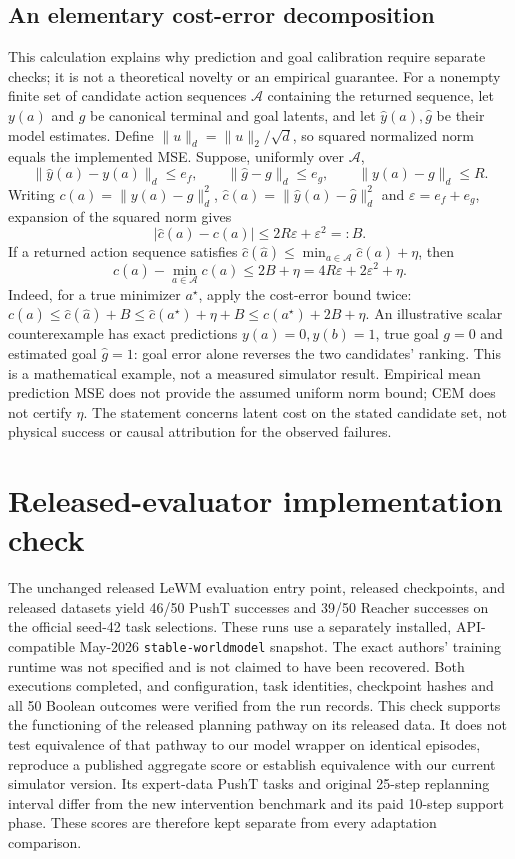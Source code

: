 \subsection{An elementary cost-error decomposition}
This calculation explains why prediction and goal calibration require separate
checks; it is not a theoretical novelty or an empirical guarantee.
For a nonempty finite set of candidate action sequences $\mathcal A$ containing
the returned sequence, let $y(a)$ and $g$ be canonical terminal and goal latents,
and let $\hat y(a),\hat g$ be their model estimates. Define
$\|u\|_d=\|u\|_2/\sqrt d$, so squared normalized norm equals the implemented MSE.
Suppose, uniformly over $\mathcal A$,
\[
 \|\hat y(a)-y(a)\|_d\le e_f,\qquad
 \|\hat g-g\|_d\le e_g,\qquad \|y(a)-g\|_d\le R.
\]
Writing $c(a)=\|y(a)-g\|_d^2$, $\hat c(a)=\|\hat y(a)-\hat g\|_d^2$
and $\varepsilon=e_f+e_g$, expansion of the squared norm gives
\[
 |\hat c(a)-c(a)|\le 2R\varepsilon+\varepsilon^2=:B.
\]
If a returned action sequence satisfies
$\hat c(\hat a)\le\min_{a\in\mathcal A}\hat c(a)+\eta$, then
\[
 c(\hat a)-\min_{a\in\mathcal A}c(a)
 \le 2B+\eta=4R\varepsilon+2\varepsilon^2+\eta.
\]
Indeed, for a true minimizer $a^\star$, apply the cost-error bound twice:
$c(\hat a)\le\hat c(\hat a)+B\le\hat c(a^\star)+\eta+B
\le c(a^\star)+2B+\eta$.
An illustrative scalar counterexample has exact predictions $y(a)=0,y(b)=1$,
true goal $g=0$ and estimated goal $\hat g=1$: goal error alone reverses
the two candidates' ranking. This is a mathematical example, not a measured
simulator result. Empirical mean prediction MSE does not provide the assumed
uniform norm bound; CEM does not certify $\eta$. The statement concerns latent
cost on the stated candidate set, not physical success or causal attribution
for the observed failures.

\FloatBarrier
\section{Released-evaluator implementation check}
The unchanged released LeWM evaluation entry point, released checkpoints,
and released datasets yield 46/50 PushT successes and 39/50 Reacher successes
on the official seed-42 task selections. These runs use a separately installed,
API-compatible May-2026 \texttt{stable-worldmodel} snapshot. The exact authors'
training runtime was not specified and is not claimed to have been recovered.
Both executions completed, and configuration, task identities, checkpoint
hashes and all 50 Boolean outcomes were verified from the run records.
This check supports the functioning of the released planning pathway on its
released data. It does not test equivalence of that pathway to our model
wrapper on identical episodes, reproduce a published aggregate score or establish equivalence
with our current simulator version. Its expert-data PushT tasks and original
25-step replanning interval differ from the new intervention benchmark and
its paid 10-step support phase. These scores are therefore kept separate
from every adaptation comparison.

